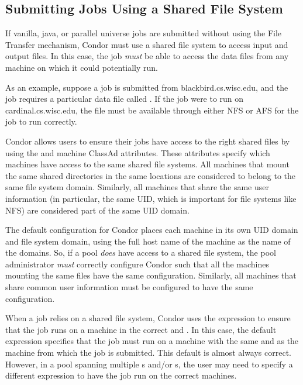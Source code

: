 
\subsection{\label{sec:shared-fs}
Submitting Jobs Using a Shared File System} 

If vanilla, java, or parallel universe
jobs are submitted without using the File Transfer mechanism, 
Condor must use a shared file system to access input and output
files. 
In this case, the job \emph{must} be able to access the data files
from any machine on which it could potentially run.

As an example, suppose a job is submitted from blackbird.cs.wisc.edu,
and the job requires a particular data file called
.  If the job were to run on
cardinal.cs.wisc.edu, the file  must be
available through either NFS or AFS for the job to run correctly.

Condor allows users to ensure their jobs have access to the right
shared files by using the  and
 machine ClassAd attributes.
These attributes specify which machines have access to the same shared
file systems.
All machines that mount the same shared directories in the same
locations are considered to belong to the same file system domain.
Similarly, all machines that share the same user information (in
particular, the same UID, which is important for file systems like
NFS) are considered part of the same UID domain.

The default configuration for Condor places each machine
in its own UID domain and file system domain, using the full host name of the
machine as the name of the domains.
So, if a pool \emph{does} have access to a shared file system,
the pool administrator \emph{must} correctly configure Condor 
such that all
the machines mounting the same files have the same
 configuration.
Similarly, all machines that share common user information must be
configured to have the same  configuration.

When a job relies on a shared file system,
Condor uses the
 expression to ensure that the job runs
on a machine in the
correct  and .
In this case, the default  expression specifies
that the job must run on a machine with the same 
and  as the machine from which the job
is submitted.
This default is almost always correct.
However, in a pool spanning multiple s and/or
s, the user may need to specify a different
 expression to have the job run on the correct
machines.

